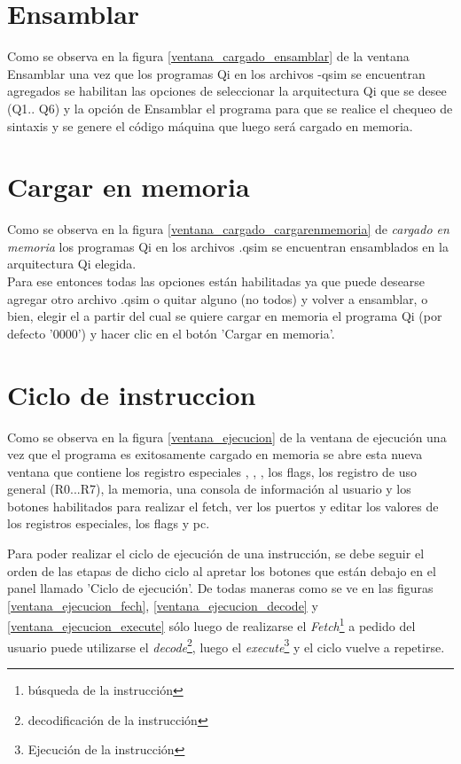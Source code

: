 \section{Ensamblar}
Como se observa en la figura \ref{ventana_cargado_ensamblar} de la ventana Ensamblar una vez que los programas Qi en los archivos -qsim se encuentran agregados se habilitan las opciones de seleccionar la arquitectura Qi que se desee (Q1.. Q6) y la opción de Ensamblar el programa para que se realice el chequeo de sintaxis y se genere el código máquina que luego será cargado en memoria.


\section{Cargar en memoria}
Como se observa en la figura \ref{ventana_cargado_cargarenmemoria} de \textit{cargado en memoria} los programas Qi en los archivos .qsim se encuentran ensamblados en la arquitectura Qi elegida.\\
Para ese entonces todas las opciones están habilitadas ya que puede desearse agregar otro archivo .qsim o quitar alguno (no todos) y volver a ensamblar, o bien, elegir el \PC a partir del cual se quiere cargar en memoria el programa Qi (por defecto '0000') y hacer clic en el botón 'Cargar en memoria'.

\section{Ciclo de instruccion}
Como se observa en la figura \ref{ventana_ejecucion} de la ventana de ejecución una vez que el programa es exitosamente cargado en memoria se abre esta nueva ventana que contiene los registro especiales \PC, \IR, \SP, los flags, los registro de uso general (R0...R7), la memoria, una consola de información al usuario y los botones habilitados para realizar el fetch, ver los puertos y editar los valores de los registros especiales, los flags y pc.


Para poder realizar el ciclo de ejecución de una instrucción, se debe seguir el orden de las etapas de dicho ciclo al apretar los botones que están debajo en el panel llamado 'Ciclo de ejecución'. De todas maneras como se ve en las figuras \ref{ventana_ejecucion_fech}, \ref{ventana_ejecucion_decode} y \ref{ventana_ejecucion_execute} sólo luego de realizarse el \textit{Fetch}\footnote{búsqueda de la instrucción} a pedido del usuario puede utilizarse el \textit{decode}\footnote{decodificación de la instrucción}, luego el \textit{execute}\footnote{Ejecución de la instrucción} y el ciclo vuelve a repetirse.\\

